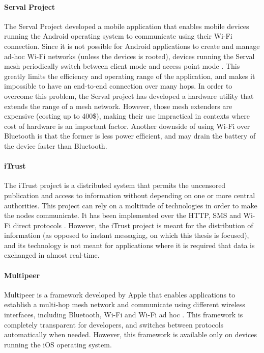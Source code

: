 \paragraph{Serval Project}
The Serval Project developed a mobile application that enables mobile devices running the Android operating system to communicate using their Wi-Fi connection.
Since it is not possible for Android applications to create and manage ad-hoc Wi-Fi networks (unless the devices is rooted), devices running the Serval mesh periodically switch between client mode and access point mode \cite{serval_multi_modal}.
This greatly limits the efficiency and operating range of the application, and makes it impossible to have an  end-to-end connection over many hops.
In order to overcome this problem, the Serval project has developed a hardware utility that extends the range of a mesh network.
However, those mesh extenders are expensive (costing up to 400\$), making their use impractical in contexts where cost of hardware is an important factor.
Another downside of using Wi-Fi over Bluetooth is that the former is less power efficient, and may drain the battery of the device faster than Bluetooth.

\paragraph{iTrust}
The iTrust project \cite{iTrust} is a distributed system that permits the uncensored publication and access to information without depending on one or more central authorities.
This project can rely on a moltitude of technologies in order to make the nodes communicate.
It has been implemented over the HTTP, SMS and Wi-Fi direct protocols \cite{iTrust_http}.
However, the iTrust project is meant for the distribution of information (as opposed to instant messaging, on which this thesis is focused), and its technology is not meant for applications where it is required that data is exchanged in almost real-time.

\paragraph{Multipeer}
Multipeer is a framework developed by Apple that enables applications to establish a multi-hop mesh network and communicate using different wireless interfaces, including Bluetooth, Wi-Fi and Wi-Fi ad hoc \cite{multipeer}.
This framework is completely transparent for developers, and switches between protocols automatically when needed.
However, this framework is available only on devices running the iOS operating system.

